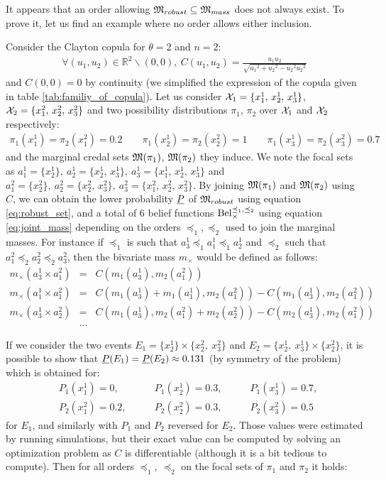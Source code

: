 It appears that an order allowing ${\mathfrak{M}}_{robust}\subseteq{\mathfrak{M}}_{mass}$ does not always exist. To prove it, let us find an example where no order allows either inclusion.
\begin{example}
Consider the Clayton copula for $\theta=2$ and $n=2$:
\begin{eqnarray*}
    \forall (u_1,u_2)\in\mathbb{R}^2\backslash(0,0), ~C(u_1,u_2)=\frac{u_1u_2}{\sqrt{{u_1}^2+{u_2}^2-{u_2}^2{u_2}^2}}
\end{eqnarray*}
and $C(0,0)=0$ by continuity (we simplified the expression of the copula given in table \ref{tab:familiy_of_copula}). Let us consider ${\mathcal{X}}_1=\{x^1_1,\, x^1_2,\, x^1_3\}$, ${\mathcal{X}}_2=\{x^2_1,\, x^2_2,\, x^2_3\}$ and two possibility distributions $\pi_1$, $\pi_2$ over ${\mathcal{X}}_1$ and ${\mathcal{X}}_2$ respectively:
\begin{eqnarray*}
    \pi_1(x^1_1)=\pi_2(x^2_1)=0.2 \qquad \pi_1(x^1_2)=\pi_2(x^2_2)=1 \qquad \pi_1(x^1_3)=\pi_2(x^2_3)=0.7 
\end{eqnarray*}
and the marginal credal sets ${\mathfrak{M}}(\pi_1)$, ${\mathfrak{M}}(\pi_2)$ they induce. We note the focal sets as $a^1_1=\{x^1_2\},~a^1_2=\{x^1_2,\, x^1_3\},~a^1_3=\{x^1_1,\,x^1_2,\,x^1_3\}$ and $a^2_1=\{x^2_2\},~a^2_2=\{x^2_2,\, x^2_3\},~a^2_3=\{x^2_1,\, x^2_2,\, x^2_3\}$. By joining ${\mathfrak{M}}(\pi_1)$ and ${\mathfrak{M}}(\pi_2)$ using $C$, we can obtain the lower probability ${\underline{P}}$ of ${\mathfrak{M}}_{robust}$ using equation \eqref{eq:robust_set}, and a total of 6 belief functions ${\mathrm{Bel}}^{\preceq_1,\preceq_2}_\times$ using equation \eqref{eq:joint_mass} depending on the orders $\preceq_1, \preceq_2$ used to join the marginal masses. For instance if $\preceq_1$ is such that $a^1_3\preceq_1 a^1_1 \preceq_1 a^1_2$ and $\preceq_2$ such that $a^2_1 \preceq_2 a^2_2 \preceq_2 a^2_3$, then the bivariate mass $m_\times$ would be defined as follows:
\begin{eqnarray*}
    m_\times(a^1_3\times a^2_1) &=& C(m_1(a^1_3), m_2(a^2_1))\\
    m_\times(a^1_1\times a^2_1) &=& C(m_1(a^1_3)+m_1(a^1_1), m_2(a^2_1)) - C(m_1(a^1_3), m_2(a^2_1))\\
    m_\times(a^1_3\times a^2_2) &=& C(m_1(a^1_3), m_2(a^2_1) + m_2(a^2_2)) - C(m_2(a^1_3), m_2(a^2_1))\\
    &\dots&
\end{eqnarray*}

If we consider the two events $E_1=\{x^1_2\}\times\{x^2_2,~x^2_3\}$ and $E_2=\{x^1_2,~x^1_3\}\times\{x^2_2\}$, it is possible to show that ${\underline{P}}(E_1)={\underline{P}}(E_2)\approx0.131$ (by symmetry of the problem) which is obtained for:
\begin{align*}
    &P_1(x^1_1)=0, \qquad&P_1(x^1_2)=0.3, \qquad&P_1(x^1_3)=0.7,\\
    &P_2(x^2_1)=0.2, \qquad&P_2(x^2_2)=0.3, \qquad&P_2(x^2_3)=0.5
\end{align*}
for $E_1$, and similarly with $P_1$ and $P_2$ reversed for $E_2$. Those values were estimated by running simulations, but their exact value can be computed by solving an optimization problem as $C$ is differentiable (although it is a bit tedious to compute). Then for all orders $\preceq_1,~\preceq_2$ on the focal sets of $\pi_1$ and $\pi_2$ it holds:


\end{example}
